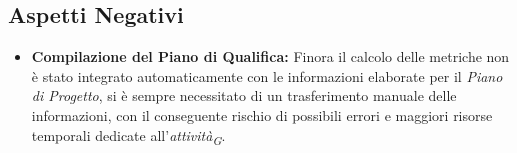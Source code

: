 \subsection{Aspetti Negativi}
\begin{itemize}
    \item \textbf{Compilazione del Piano di Qualifica:} Finora il calcolo delle metriche non è stato integrato automaticamente con le informazioni elaborate per il \textit{Piano di Progetto}, si è sempre necessitato di un trasferimento manuale delle informazioni, con il conseguente rischio di possibili errori e maggiori risorse temporali dedicate all'\textit{attività}\textsubscript{\textit{G}}.
\end{itemize}